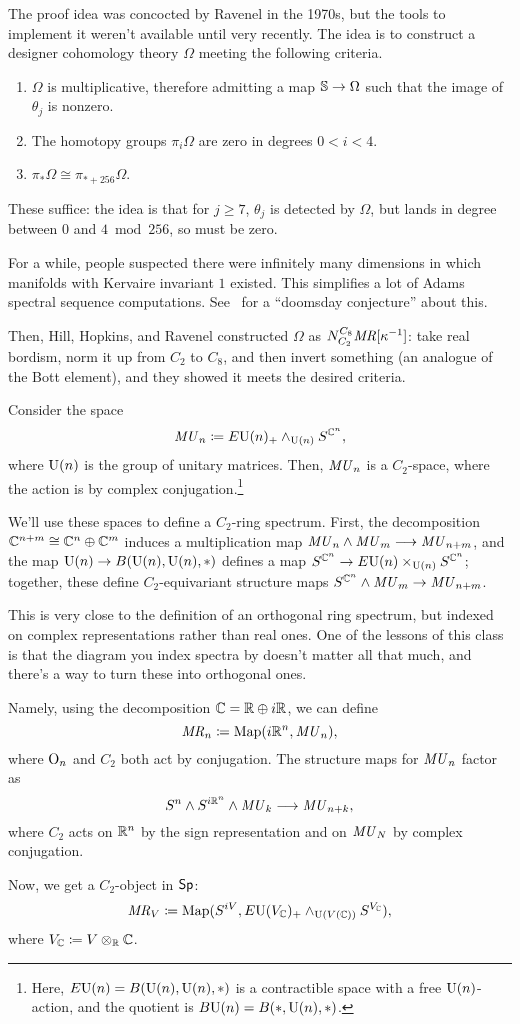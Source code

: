 The proof idea was concocted by Ravenel in the 1970s, but the tools to implement it weren't available until very
recently. The idea is to construct a designer cohomology theory $\Omega$ meeting the following criteria.
\begin{enumerate}
	\item $\Omega$ is multiplicative, therefore admitting a map $\mathbb S\to\Omega$ such that the image of $\theta_j$
	is nonzero.
	\item The homotopy groups $\pi_i\Omega$ are zero in degrees $0 < i < 4$.
	\item $\pi_*\Omega\cong\pi_{*+256}\Omega$.
\end{enumerate}
These suffice: the idea is that for $j\ge 7$, $\theta_j$ is detected by $\Omega$, but lands in degree between $0$
and $4\bmod 256$, so must be zero.
\begin{rem}
For a while, people suspected there were infinitely many dimensions in which manifolds with Kervaire invariant $1$
existed. This simplifies a lot of Adams spectral sequence computations. See~ for a ``doomsday
conjecture'' about this.
\end{rem}
Then, Hill, Hopkins, and Ravenel constructed $\Omega$ as $N_{C_2}^{C_8}\mathit{MR}[\kappa^{-1}]$: take real bordism, norm
it up from $C_2$ to $C_8$, and then invert something (an analogue of the Bott element), and they showed it meets
the desired criteria. 
\begin{defn}
Consider the space
\[\mathit{MU}_n\coloneqq E\mathrm U(n)_+\wedge_{\mathrm U(n)} S^{\mathbb C^n},\]
where $\mathrm U(n)$ is the group of unitary matrices. Then, $\mathit{MU}_n$ is a $C_2$-space, where the action is by complex
conjugation.\footnote{Here, $E\mathrm U(n) = B(\mathrm U(n), \mathrm U(n), *)$ is a contractible space with a free $\mathrm U(n)$-action, and
the quotient is $B\mathrm U(n) = B(*, \mathrm U(n), *)$.}

We'll use these spaces to define a $C_2$-ring spectrum. First, the decomposition $\mathbb C^{n+m}\cong\mathbb C^n\oplus\mathbb C^m$
induces a multiplication map $\mathit{MU}_n\wedge\mathit{MU}_m\longrightarrow \mathit{MU}_{n+m}$, and the map $\mathrm U(n)\to B(\mathrm U(n), \mathrm U(n), *)$
defines a map $S^{\mathbb C^n}\to E\mathrm U(n)\times_{\mathrm U(n)} S^{\mathbb C^n}$; together, these define $C_2$-equivariant structure maps
$S^{\mathbb C^n}\wedge\mathit{MU}_m\to \mathit{MU}_{n+m}$.

This is very close to the definition of an orthogonal ring spectrum, but indexed on complex representations rather
than real ones. One of the lessons of this class is that the diagram you index spectra by doesn't matter all that
much, and there's a way to turn these  into orthogonal ones.

Namely, using the decomposition $\mathbb C = \mathbb R\oplus i\mathbb R$, we can define
\[\mathit{MR}_n\coloneqq \operatorname{Map}(i\mathbb R^n, \mathit{MU}_n),\]
where $\mathrm O_n$ and $C_2$ both act by conjugation. The structure maps for $\mathit{MU}_n$ factor as
\[S^n\wedge S^{i\mathbb R^n}\wedge\mathit{MU}_k\longrightarrow \mathit{MU}_{n+k},\]
where $C_2$ acts on $\mathbb R^n$ by the sign representation and on $\mathit{MU}_N$ by complex conjugation.

Now, we get a $C_2$-object in $\mathsf{Sp}$:
\[\mathit{MR}_V \coloneqq \operatorname{Map}(S^{iV}, E\mathrm U(V_\mathbb C)_+\wedge_{\mathrm U(V(\mathbb C))}S^{V_\mathbb C}),\]
where $V_\mathbb C\coloneqq V\otimes_\mathbb R\mathbb C$.
\end{defn}
